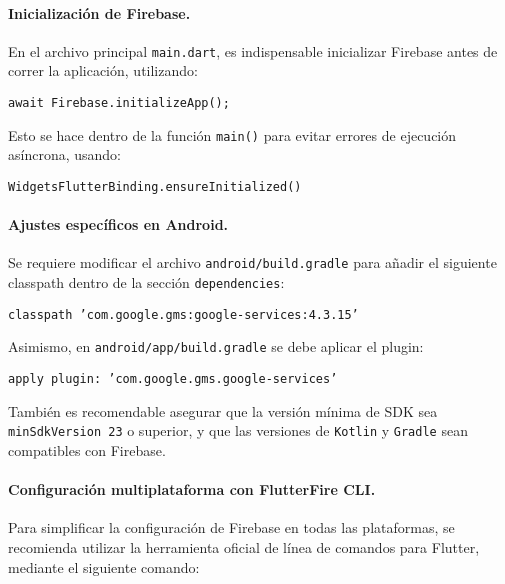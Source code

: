 \paragraph{Inicialización de Firebase.}  
En el archivo principal \texttt{main.dart}, es indispensable inicializar Firebase antes de correr la aplicación, utilizando:

\begin{center}
  \texttt{await Firebase.initializeApp();}
\end{center}

Esto se hace dentro de la función \texttt{main()} para evitar errores de ejecución asíncrona, usando:
\begin{center}
  \texttt{WidgetsFlutterBinding.ensureInitialized()}
\end{center}

\vspace{1em}

\paragraph{Ajustes específicos en Android.}  
Se requiere modificar el archivo \texttt{android/build.gradle} para añadir el siguiente classpath dentro de la sección \texttt{dependencies}:

\begin{center}
  \texttt{classpath 'com.google.gms:google-services:4.3.15'}
\end{center}

Asimismo, en \texttt{android/app/build.gradle} se debe aplicar el plugin:

\begin{center}
  \texttt{apply plugin: 'com.google.gms.google-services'}
\end{center}

También es recomendable asegurar que la versión mínima de SDK sea \texttt{minSdkVersion 23} o superior, y que las versiones de \texttt{Kotlin} y \texttt{Gradle} sean compatibles con Firebase.

\vspace{1em}

\paragraph{Configuración multiplataforma con FlutterFire CLI.}  
Para simplificar la configuración de Firebase en todas las plataformas, se recomienda utilizar la herramienta oficial de línea de comandos para Flutter, mediante el siguiente comando:

